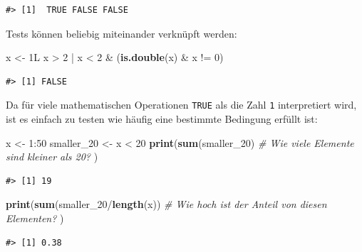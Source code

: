 \documentclass[]{tufte-book}
\newenvironment{Shaded}{}{}
\newcommand{\KeywordTok}[1]{\textcolor[rgb]{0.00,0.44,0.13}{\textbf{#1}}}
\newcommand{\DecValTok}[1]{\textcolor[rgb]{0.25,0.63,0.44}{#1}}
\newcommand{\StringTok}[1]{\textcolor[rgb]{0.25,0.44,0.63}{#1}}
\newcommand{\CommentTok}[1]{\textcolor[rgb]{0.38,0.63,0.69}{\textit{#1}}}
\newcommand{\OperatorTok}[1]{\textcolor[rgb]{0.40,0.40,0.40}{#1}}
\newcommand{\NormalTok}[1]{#1}
\begin{document}
\begin{verbatim}
#> [1]  TRUE FALSE FALSE
\end{verbatim}

Tests können beliebig miteinander verknüpft werden:

\begin{Shaded}
\begin{Highlighting}[]
\NormalTok{x <-}\StringTok{ }\NormalTok{1L}
\NormalTok{x }\OperatorTok{>}\StringTok{ }\DecValTok{2} \OperatorTok{|}\StringTok{ }\NormalTok{x }\OperatorTok{<}\StringTok{ }\DecValTok{2} \OperatorTok{&}\StringTok{ }\NormalTok{(}\KeywordTok{is.double}\NormalTok{(x) }\OperatorTok{&}\StringTok{ }\NormalTok{x }\OperatorTok{!=}\StringTok{ }\DecValTok{0}\NormalTok{)}
\end{Highlighting}
\end{Shaded}

\begin{verbatim}
#> [1] FALSE
\end{verbatim}

Da für viele mathematischen Operationen \texttt{TRUE} als die Zahl
\texttt{1} interpretiert wird, ist es einfach zu testen wie häufig eine
bestimmte Bedingung erfüllt ist:

\begin{Shaded}
\begin{Highlighting}[]
\NormalTok{x <-}\StringTok{ }\DecValTok{1}\OperatorTok{:}\DecValTok{50}
\NormalTok{smaller_}\DecValTok{20}\NormalTok{ <-}\StringTok{ }\NormalTok{x }\OperatorTok{<}\StringTok{ }\DecValTok{20}
\KeywordTok{print}\NormalTok{(}\KeywordTok{sum}\NormalTok{(smaller_}\DecValTok{20}\NormalTok{)  }\CommentTok{# Wie viele Elemente sind kleiner als 20?}
\NormalTok{)}
\end{Highlighting}
\end{Shaded}

\begin{verbatim}
#> [1] 19
\end{verbatim}

\begin{Shaded}
\begin{Highlighting}[]
\KeywordTok{print}\NormalTok{(}\KeywordTok{sum}\NormalTok{(smaller_}\DecValTok{20}\OperatorTok{/}\KeywordTok{length}\NormalTok{(x))  }\CommentTok{# Wie hoch ist der Anteil von diesen Elementen?}
\NormalTok{)}
\end{Highlighting}
\end{Shaded}

\begin{verbatim}
#> [1] 0.38
\end{verbatim}
\end{document}
